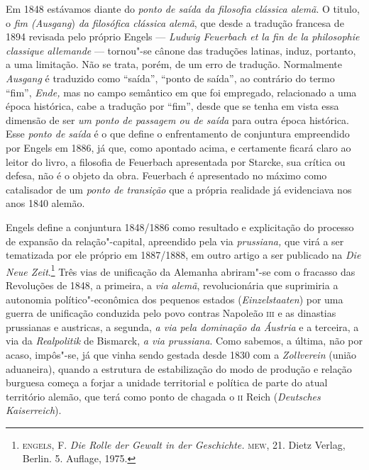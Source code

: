 Em 1848 estávamos diante do \emph{ponto de saída da filosofia clássica
alemã}. O titulo, o \emph{fim (Ausgang}) \emph{da filosófica clássica
alemã}, que desde a tradução francesa de 1894 revisada pelo próprio
Engels --- \emph{Ludwig Feuerbach et la fin de la philosophie classique
allemande} --- tornou"-se cânone das traduções latinas, induz, portanto,
a uma limitação. Não se trata, porém, de um erro de tradução.
Normalmente \emph{Ausgang} é traduzido como ``saída'', ``ponto de
saída'', ao contrário do termo ``fim'', \emph{Ende,} mas no campo
semântico em que foi empregado, relacionado a uma época histórica, cabe
a tradução por ``fim'', desde que se tenha em vista essa dimensão de ser
\emph{um ponto de passagem ou de saída} para outra época histórica. Esse
\emph{ponto de saída} é o que define o enfrentamento de conjuntura
empreendido por Engels em 1886, já que, como apontado acima, e
certamente ficará claro ao leitor do livro, a filosofia de Feuerbach
apresentada por Starcke, sua crítica ou defesa, não é o objeto da obra.
Feuerbach é apresentado no máximo como catalisador de um \emph{ponto de
transição} que a própria realidade já evidenciava nos anos 1840 alemão.

Engels define a conjuntura 1848/1886 como resultado e explicitação do
processo de expansão da relação"-capital, apreendido pela via
\emph{prussiana,} que virá a ser tematizada por ele próprio em
1887/1888, em outro artigo a ser publicado na \emph{Die Neue Zeit}.\footnote{\textsc{engels}, F. \emph{Die Rolle der Gewalt in der
  Geschichte.} \textsc{mew}, 21. Dietz Verlag, Berlin. 5. Auflage, 1975.}
Três vias de unificação da Alemanha abriram"-se com o fracasso das
Revoluções de 1848, a primeira, a \emph{via alemã}, revolucionária que
suprimiria a autonomia político"-econômica dos pequenos estados
(\emph{Einzelstaaten}) por uma guerra de unificação conduzida pelo povo
contras Napoleão \textsc{iii} e as dinastias prussianas e austricas, a
segunda, \emph{a via pela dominação da Áustria} e a terceira, a via da
\emph{Realpolitik} de Bismarck, \emph{a via prussiana}. Como sabemos, a
última, não por acaso, impôs"-se, já que vinha sendo gestada desde 1830
com a \emph{Zollverein} (união aduaneira), quando a estrutura de
estabilização do modo de produção e relação burguesa começa a forjar a
unidade territorial e política de parte do atual território alemão, que
terá como ponto de chagada o \textsc{ii} Reich (\emph{Deutsches
Kaiserreich}).

